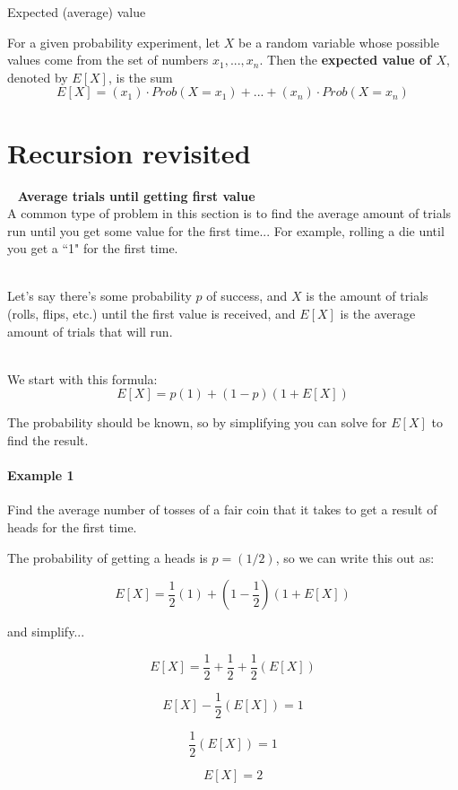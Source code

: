 \documentclass[a4paper,12pt]{book}
\begin{document}
        \begin{intro}{Expected (average) value}
            
            For a given probability experiment, let $X$ be a random
            variable whose possible values come from the set of numbers
            $ x_{1}, ..., x_{n} $. Then the \textbf{expected value of $X$},
            denoted by $E[X]$, is the sum
            $$ E[X] = (x_{1}) \cdot Prob(X = x_{1}) + ... + (x_{n}) \cdot Prob(X = x_{n}) $$

        \end{intro}

        \newpage

        
    \section{Recursion revisited}

        \begin{intro}{\ }
            \textbf{Average trials until getting first value} \\
            A common type of problem in this section is to find the
            average amount of trials run until you get some value for
            the first time... For example, rolling a die until you
            get a ``1" for the first time.

            ~\\
            Let's say there's some probability $p$ of success, and $X$
            is the amount of trials (rolls, flips, etc.) until the first
            value is received, and $E[X]$ is the average amount of
            trials that will run.

            ~\\
            We start with this formula:
            $$ E[X] = p(1) + (1 - p)(1 + E[X]) $$

            The probability should be known, so by simplifying you
            can solve for $E[X]$ to find the result.

            \paragraph{Example 1}
                Find the average number of tosses of a fair coin that it takes
                to get a result of heads for the first time.

                The probability of getting a heads is $p = (1/2)$, so we
                can write this out as:

                $$ E[X] = \frac{1}{2}(1) + (1 - \frac{1}{2})(1 + E[X]) $$

                and simplify...

                $$ E[X] = \frac{1}{2} + \frac{1}{2} + \frac{1}{2}(E[X]) $$

                $$ E[X] - \frac{1}{2}(E[X]) = 1 $$

                $$ \frac{1}{2}(E[X]) = 1 $$

                $$ E[X] = 2 $$
        \end{intro}
\end{document}
